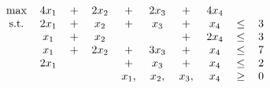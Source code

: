 \documentclass[12pt]{article}
\begin{document}
    \begin{align*}
        \begin{tabular}{cccccccccc}
            \text{max} & $4x_1$ & $+$ & $2x_2$ & $+$ & $2x_3$ & $+$ & $4x_4$ \\
            \text{s.t.} & $2x_1$ & $+$ & $x_2$ & $+$ & $x_3$ & $+$ & $x_4$ & $\leq$ & 3 \\
            & $x_1$ & $+$ & $x_2$ & & & $+$ & $2x_4$ & $\leq$ & 3 \\
            & $x_1$ & $+$ & $2x_2$ & $+$ & $3x_3$ & $+$ & $x_4$ & $\leq$ & 7 \\
            & $2x_1$ & & & $+$ & $x_3$ & $+$ & $x_4$ & $\leq$ & 2\\
            & & & & $x_1,$ & $x_2,$ & $x_3,$ & $x_4$ & $\geq$ & 0
        \end{tabular}
    \end{align*}
\end{document}
